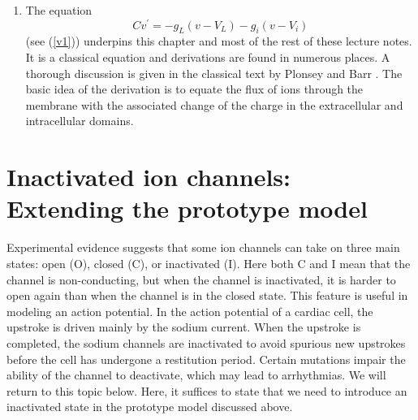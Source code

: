 \begin{enumerate}
\item
The equation
\begin{equation}
Cv^{\prime}=-g_{L}\left(  v-V_{L}\right)  -g_{i}(v-V_{i}) 
\end{equation}
(see (\ref{v1})) underpins this chapter and most of the rest of these lecture notes. It is a classical equation
and derivations are found in numerous places. A thorough discussion is given in the classical text by Plonsey and Barr \cite{Plonsey2007}.
The basic idea of the derivation is to equate the flux of ions through the membrane with the associated change of the charge in the extracellular
and intracellular domains.
\end{enumerate}



\chapter[Inactivated ion channels]{Inactivated ion channels: Extending the prototype model \label{inactivated}}

Experimental evidence suggests that some ion channels can take on three main
states: open (O), closed (C), or inactivated (I). Here both C and I mean that
the channel is non-conducting, but when the channel is inactivated, it is harder
to open again than when the channel is in the closed state. This feature is
useful in modeling an action potential. In the action potential of a
cardiac cell, the upstroke is driven mainly by the sodium current. When the
upstroke is completed, the sodium channels are inactivated to avoid
spurious new upstrokes before the cell has undergone a restitution period. 
Certain mutations impair the ability of the channel to deactivate, which
may lead to arrhythmias. We will return to this topic below. Here,
it suffices to state that we need to introduce an inactivated state in the
prototype model discussed above.

